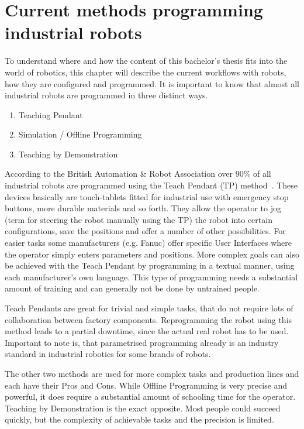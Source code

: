 \section{Current methods programming industrial robots}
To understand where and how the content of this bachelor's thesis fits into the world of robotics, this chapter will describe the current workflows with robots, how they are configured and programmed. It is important to know that almost all industrial robots are programmed in three distinct ways.
\begin{enumerate}
	\setcounter{enumi}{0}
	\setlength\itemsep{-1em}
	\item Teaching Pendant
	\item Simulation / Offline Programming
	\item Teaching by Demonstration
\end{enumerate}

According to the British Automation \& Robot Association over 90\% of all industrial robots are programmed using the Teach Pendant (TP) method~\cite{bara}. These devices basically are touch-tablets fitted for industrial use with emergency stop buttons, more durable materials and so forth. They allow the operator to jog (term for steering the robot manually using the TP) the robot into certain configurations, save the positions and offer a number of other possibilities. For easier tasks some manufacturers (e.g. Fanuc) offer specific User Interfaces where the operator simply enters parameters and positions. More complex goals can also be achieved with the Teach Pendant by programming in a textual manner, using each manufacturer's own language. This type of programming needs a substantial amount of training and can generally not be done by untrained people. 

Teach Pendants are great for trivial and simple tasks, that do not require lots of collaboration between factory components. Reprogramming the robot using this method leads to a partial downtime, since the actual real robot has to be used. Important to note is, that parametrised programming already is an industry standard in industrial robotics for some brands of robots. 

The other two methods are used for more complex tasks and production lines and each have their Pros and Cons. While Offline Programming is very precise and powerful, it does require a substantial amount of schooling time for the operator. Teaching by Demonstration is the exact opposite. Most people could succeed quickly, but the complexity of achievable tasks and the precision is limited.

